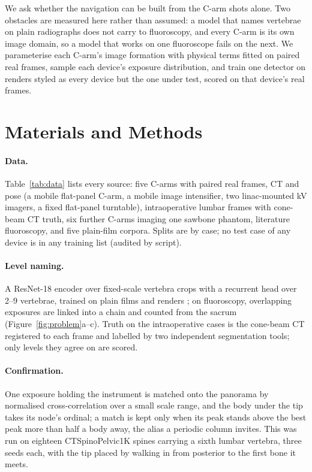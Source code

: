 \documentclass[11pt,letterpaper]{article}
\begin{document}
We ask whether the navigation can be built from the C-arm shots alone. Two obstacles are measured here rather than assumed: a model that names vertebrae on plain radiographs does not carry to fluoroscopy, and every C-arm is its own image domain, so a model that works on one fluoroscope fails on the next. We parameterise each C-arm's image formation with physical terms fitted on paired real frames, sample each device's exposure distribution, and train one detector on renders styled as every device but the one under test, scored on that device's real frames.

\section*{Materials and Methods}
\paragraph{Data.} Table~\ref{tab:data} lists every source: five C-arms with paired real frames, CT and pose (a mobile flat-panel C-arm, a mobile image intensifier, two linac-mounted kV imagers, a fixed flat-panel turntable), intraoperative lumbar frames with cone-beam CT truth, six further C-arms imaging one sawbone phantom, literature fluoroscopy, and five plain-film corpora. Splits are by case; no test case of any device is in any training list (audited by script).
\paragraph{Level naming.} A ResNet-18 encoder over fixed-scale vertebra crops with a recurrent head over 2--9 vertebrae, trained on plain films and renders \citep{schwing2026ctx,schwing2026mixed}; on fluoroscopy, overlapping exposures are linked into a chain and counted from the sacrum (Figure~\ref{fig:problem}a--c). Truth on the intraoperative cases is the cone-beam CT registered to each frame and labelled by two independent segmentation tools; only levels they agree on are scored.
\paragraph{Confirmation.} One exposure holding the instrument is matched onto the panorama by normalised cross-correlation over a small scale range, and the body under the tip takes its node's ordinal; a match is kept only when its peak stands above the best peak more than half a body away, the alias a periodic column invites. This was run on eighteen CTSpinoPelvic1K spines carrying a sixth lumbar vertebra, three seeds each, with the tip placed by walking in from posterior to the first bone it meets.
\end{document}
